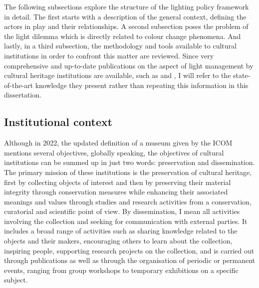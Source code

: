 The following subsections explore the structure of the lighting policy framework in detail. The first starts with a description of the general context, defining the actors in play and their relationships. A second subsection poses the problem of the light dilemma which is directly related to colour change phenomena. And lastly, in a third subsection, the methodology and tools available to cultural institutions in order to confront this matter are reviewed. Since very comprehensive and up-to-date publications on the aspect of light management by cultural heritage institutions are available, such as \citet{michalski_light_2018} and \citet{saunders_museum_2020}, I will refer to the state-of-the-art knowledge they present rather than repeating this information in this dissertation.\\

\subsection{Institutional context}

Although in 2022, the updated definition of a museum given by the \gls{ICOM} mentions several objectives, globally speaking, the objectives of cultural institutions can be summed up in just two words: preservation and dissemination. The primary mission of these institutions is the preservation of cultural heritage, first by collecting objects of interest and then by preserving their material integrity through conservation measures while enhancing their associated meanings and values through studies and research activities from a conservation, curatorial and scientific point of view. By dissemination, I mean all activities involving the collection and seeking for communication with external parties. It includes a broad range of activities such as sharing knowledge related to the objects and their makers, encouraging others to learn about the collection, inspiring people, supporting research projects on the collection, and is carried out through publications as well as through the organisation of periodic or permanent events, ranging from group workshops to temporary exhibitions on a specific subject.\\

